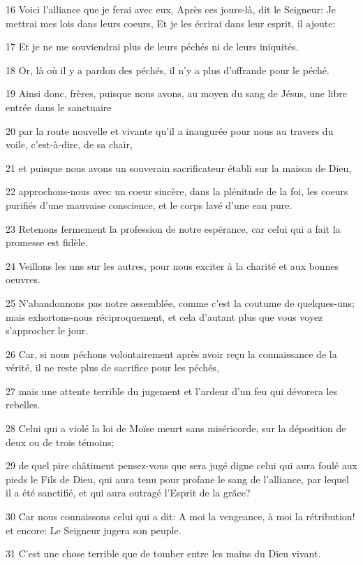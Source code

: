 \par 16 Voici l'alliance que je ferai avec eux, Après ces jours-là, dit le Seigneur: Je mettrai mes lois dans leurs coeurs, Et je les écrirai dans leur esprit, il ajoute:
\par 17 Et je ne me souviendrai plus de leurs péchés ni de leurs iniquités.
\par 18 Or, là où il y a pardon des péchés, il n'y a plus d'offrande pour le péché.
\par 19 Ainsi donc, frères, puisque nous avons, au moyen du sang de Jésus, une libre entrée dans le sanctuaire
\par 20 par la route nouvelle et vivante qu'il a inaugurée pour nous au travers du voile, c'est-à-dire, de sa chair,
\par 21 et puisque nous avons un souverain sacrificateur établi sur la maison de Dieu,
\par 22 approchons-nous avec un coeur sincère, dans la plénitude de la foi, les coeurs purifiés d'une mauvaise conscience, et le corps lavé d'une eau pure.
\par 23 Retenons fermement la profession de notre espérance, car celui qui a fait la promesse est fidèle.
\par 24 Veillons les uns sur les autres, pour nous exciter à la charité et aux bonnes oeuvres.
\par 25 N'abandonnons pas notre assemblée, comme c'est la coutume de quelques-uns; mais exhortons-nous réciproquement, et cela d'autant plus que vous voyez s'approcher le jour.
\par 26 Car, si nous péchons volontairement après avoir reçu la connaissance de la vérité, il ne reste plus de sacrifice pour les péchés,
\par 27 mais une attente terrible du jugement et l'ardeur d'un feu qui dévorera les rebelles.
\par 28 Celui qui a violé la loi de Moïse meurt sans miséricorde, sur la déposition de deux ou de trois témoins;
\par 29 de quel pire châtiment pensez-vous que sera jugé digne celui qui aura foulé aux pieds le Fils de Dieu, qui aura tenu pour profane le sang de l'alliance, par lequel il a été sanctifié, et qui aura outragé l'Esprit de la grâce?
\par 30 Car nous connaissons celui qui a dit: A moi la vengeance, à moi la rétribution! et encore: Le Seigneur jugera son peuple.
\par 31 C'est une chose terrible que de tomber entre les mains du Dieu vivant.
